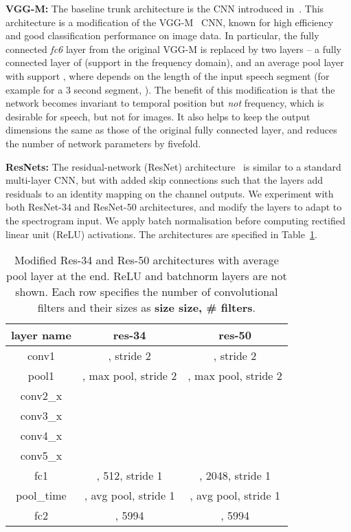 \documentclass[a4paper]{article}
\def\newpara{\vspace{2pt}}
\def\aftertab{\vspace{-22pt}}
\begin{document}
\newpara\noindent\textbf{VGG-M:}  The baseline trunk architecture is the CNN introduced
in~\cite{Nagrani17}. This architecture is a modification of
the VGG-M~\cite{Chatfield14} CNN, known for high efficiency and good
classification performance on image data.
In particular, 
the fully connected {\em fc6} layer from the original VGG-M is replaced by two layers -- a fully connected layer of  (support in the frequency domain), and an average pool layer with support , where  depends on the length of the input speech segment
(for example for a 3 second segment, ). 
The benefit of this modification is that the network becomes invariant
to temporal position but \textit{not} frequency, which is desirable for speech, but not for images. It also helps to keep the output dimensions the same as those of the original fully connected layer, and reduces the number of network parameters by fivefold.

\newpara\noindent\textbf{ResNets:} 
The residual-network (ResNet) architecture~\cite{He15}  is similar to a standard
multi-layer CNN, but with added skip connections such that the layers add residuals to
an identity mapping on the channel outputs.
We experiment with both
ResNet-34 and ResNet-50 architectures, 
and modify the layers to adapt to the
spectrogram input. We apply batch normalisation before computing
rectified linear unit (ReLU) activations.  
The architectures are specified in Table~\ref{table:convnet}.

\begin{table}[ht]
\footnotesize
\centering
\begin{tabular}{ c|c|c }
\textbf{layer name} & \textbf{res-34}  & \textbf{res-50}   \\ \hline
conv1 & , stride 2 & , stride 2\\ 
pool1 &  , max pool, stride 2 &  , max pool, stride 2 \\  \hline
conv2\_x &    &           \\\hline
conv3\_x &  &            \\\hline
conv4\_x &    &           \\\hline
conv5\_x &     &             \\\hline
fc1 &  , 512, stride 1  &  , 2048, stride 1                  \\ 
pool\_time &  , avg pool, stride 1  &  , avg pool, stride 1\\ 
fc2 &  , 5994 &  , 5994 \\ 
\end{tabular}
\vspace{2pt}
\normalsize
\caption{Modified Res-34 and Res-50 architectures with average pool layer at the end. ReLU and batchnorm layers are not shown.  Each row specifies the number of convolutional filters and their sizes as {\bf size  size, \# filters}.}
\label{table:convnet}
\aftertab
\vspace{-8pt}
\end{table}
\end{document}
